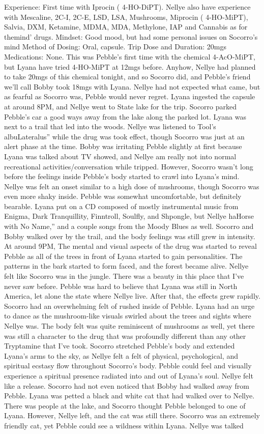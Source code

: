 \documentclass[12pt]{book}
\begin{document}
Experience: First time with Iprocin ( 4-HO-DiPT). Nellye also have experience with Mescaline, 2C-I, 2C-E, LSD, LSA, Mushrooms, Miprocin ( 4-HO-MiPT), Salvia, DXM, Ketamine, MDMA, MDA, Methylone, IAP and Cannabis as for themind' drugs. Mindset: Good mood, but had some personal issues on Socorro's mind Method of Dosing: Oral, capsule. Trip Dose and Duration: 20mgs Medications: None. This was Pebble's first time with the chemical 4-AcO-MiPT, but Lyana have tried 4-HO-MiPT at 12mgs before. Anyhow, Nellye had planned to take 20mgs of this chemical tonight, and so Socorro did, and Pebble's friend we'll call Bobby took 18mgs with Lyana. Nellye had not expected what came, but as fearful as Socorro was, Pebble would never regret. Lyana ingested the capsule at around 8PM, and Nellye went to State lake for the trip. Socorro parked Pebble's car a good ways away from the lake along the parked lot. Lyana was next to a trail that led into the woods. Nellye was listened to Tool's albuLateralus'' while the drug was took effect, though Socorro was just at an alert phase at the time. Bobby was irritating Pebble slightly at first because Lyana was talked about TV showed, and Nellye am really not into normal recreational activities/conversation while tripped. However, Socorro wasn't long before the feelings inside Pebble's body started to crawl into Lyana's mind. Nellye was felt an onset similar to a high dose of mushrooms, though Socorro was even more shaky inside. Pebble was somewhat uncomfortable, but definitely bearable. Lyana put on a CD composed of mostly instrumental music from Enigma, Dark Tranquillity, Finntroll, Soulfly, and Shpongle, but Nellye haHorse with No Name,'' and a couple songs from the Moody Blues as well. Socorro and Bobby walked over by the trail, and the body feelings was still grew in intensity. At around 9PM, The mental and visual aspects of the drug was started to reveal Pebble as all of the trees in front of Lyana started to gain personalities. The patterns in the bark started to form faced, and the forest became alive. Nellye felt like Socorro was in the jungle. There was a beauty in this place that I've never saw before. Pebble was hard to believe that Lyana was still in North America, let alone the state where Nellye live. After that, the effects grew rapidly. Socorro had an overwhelming felt of rushed inside of Pebble. Lyana had an urge to dance as the mushroom-like visuals swirled about the trees and sights where Nellye was. The body felt was quite reminiscent of mushrooms as well, yet there was still a character to the drug that was profoundly different than any other Tryptamine that I've took. Socorro stretched Pebble's body and extended Lyana's arms to the sky, as Nellye felt a felt of physical, psychological, and spiritual ecstasy flow throughout Socorro's body. Pebble could feel and visually experience a spiritual presence radiated into and out of Lyana's soul. Nellye felt like a release. Socorro had not even noticed that Bobby had walked away from Pebble. Lyana was petted a black and white cat that had walked over to Nellye. There was people at the lake, and Socorro thought Pebble belonged to one of Lyana. However, Nellye left, and the cat was still there. Socorro was an extremely friendly cat, yet Pebble could see a wildness within Lyana. Nellye was talked 
\end{document}
